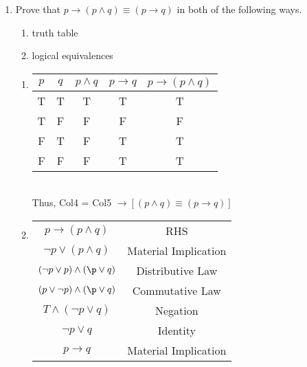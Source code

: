 \begin{enumerate}
    
    \item Prove that $p\rightarrow(p\wedge q) \equiv (p \rightarrow q)$ in both of the following ways.
    \begin{enumerate}
        \item truth table 
        \item logical equivalences 
    \end{enumerate}
    \begin{solution}
    \begin{enumerate}
        \item \begin{tabular}{c|c|c|c|c}
             $p$ & $q$ & $p \land q$ & $p \rightarrow q$ & $p \rightarrow (p \land q)$ \\
             \hline
             T & T & T & T & T\\
             T & F & F & F & F\\
             F & T & F & T & T\\
             F & F & F & T & T\\
        \end{tabular} \\
        Thus, Col4 = Col5 $\rightarrow [(p\wedge q) \equiv (p \rightarrow q)]$
        \item \begin{tabular}{c|c}
             $p \rightarrow (p \land q)$ & RHS \\
             $\neg p \lor (p \land q)$ & Material Implication\\
             $(\neg p \lor p) \land (\p \lor q)$ & Distributive Law\\
             $(p \lor \neg p) \land (\p \lor q)$ & Commutative Law\\
             $T \land (\neg p \lor q)$ & Negation\\
             $\neg p \lor q$ & Identity \\
             $p \rightarrow q$ & Material Implication
             \end{tabular}
        \end{enumerate}
    \end{solution}
    
    
\end{enumerate}
